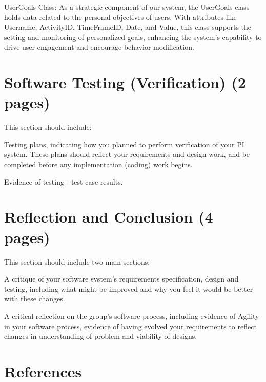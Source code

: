 \documentclass[12pt]{article}
\begin{document}
UserGoals Class: As a strategic component of our system, the UserGoals class holds data related to the personal objectives of users. With attributes like Username, ActivityID, TimeFrameID, Date, and Value, this class supports the setting and monitoring of personalized goals, enhancing the system's capability to drive user engagement and encourage behavior modification.\par



\section{Software Testing (Verification) (2 pages)}

This section should include:

Testing plans, indicating how you planned to perform verification of your PI system.
These plans should reflect your requirements and design work, and be completed
before any implementation (coding) work begins.

Evidence of testing - test case results.


\section{Reflection and Conclusion (4 pages)}

This section should include two main sections:

A critique of your software system’s requirements specification, design and testing,
including what might be improved and why you feel it would be better with these
changes.

A critical reflection on the group’s software process, including evidence of Agility in
your software process, evidence of having evolved your requirements to reflect
changes in understanding of problem and viability of designs.


\section{References}
\end{document}
